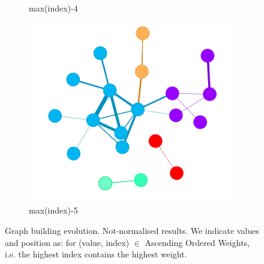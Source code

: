 \begin{figure}[!htb]
\begin{subfigure}[b]{0.15\linewidth}
		\caption{max(index)-4}
	\end{subfigure}
	\hfill
	\begin{subfigure}[b]{0.15\linewidth}
		\includegraphics[width=\linewidth]{Minor Thesis/figures/graphs/nn/F.png}
		\caption{max(index)-5}
	\end{subfigure}
	\caption{Graph building evolution. Not-normalised results. We indicate values and position as: for (value, index) $\in$ Ascending Ordered Weights, i.e. the highest index contains the highest weight.}
	\label{fig:graph-evo-nn}
\end{figure}

